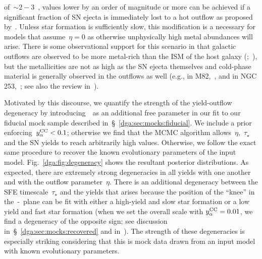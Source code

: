 \documentclass[main.tex]{subfiles}
\begin{document}
of~$\sim2 - 3$~\citep{Griffith2021b}, values lower by an order of magnitude or
more can be achieved if a significant fraction of SN ejecta is immediately
lost to a hot outflow as proposed by~\citet{Peeples2011}.
Unless star formation is sufficiently slow, this modification is a necessary
for models that assume~$\eta = 0$ as otherwise unphysically high metal
abundances will arise.
There is some observational support for this scenario in that galactic outflows
are observed to be more metal-rich than the ISM of the host galaxy
(\citealp*{Chisholm2018};~\citealp{Cameron2021}), but the metallicities are
not as high as the SN ejecta themselves and cold-phase material is generally
observed in the outflows as well (e.g., in M82,~\citealp{Lopez2020}, and in
NGC 253,~\citealp{Lopez2023}; see also the review in~\citealt{Veilleux2020}).
\par
Motivated by this discourse, we quantify the strength of the yield-outflow
degeneracy by introducing~\yacc~as an additional free parameter in our fit to
our fiducial mock sample described in~\S~\ref{dga:sec:mocks:fiducial}.
We include a prior enforcing~$y_\alpha^\text{CC} < 0.1$; otherwise we find that the MCMC
algorithm allows~$\eta$,~$\tau_\star$ and the SN yields to reach arbitrarily
high values.
Otherwise, we follow the exact same procedure to recover the known evolutionary
parameters of the input model.
Fig.~\ref{dga:fig:degeneracy} shows the resultant posterior distributions.
As expected, there are extremely strong degeneracies in all yields with one
another and with the outflow parameter~$\eta$.
There is an additional degeneracy between the SFE timescale~$\tau_\star$ and
the yields that arises because the position of the ``knee'' in
the~\afe-\feh~plane can be fit with either a high-yield and slow star formation
or a low yield and fast star formation (when we set the overall scale with
$y_\alpha^\text{CC} = 0.01$, we find a degeneracy of the opposite sign; see discussion
in~\S~\ref{dga:sec:mocks:recovered} and in~\citealt{Weinberg2017b}).
The strength of these degeneracies is especially striking considering that this
is mock data drawn from an input model with known evolutionary parameters.
\end{document}
